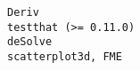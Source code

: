 \documentclass[
  letterpaper,
  DIV=11,
  numbers=noendperiod]{scrreprt}
\begin{document}
\begin{verbatim}
Deriv                                                                                                                                                                                                                                                                                                                                                                                                                                                                                                                                                                                                                                                                                                                                                                                                                                                                                                                                                                                                                                                                                                                                                                                                                                                                                    testthat (>= 0.11.0)
deSolve                                                                                                                                                                                                                                                                                                                                                                                                                                                                                                                                                                                                                                                                                                                                                                                                                                                                                                                                                                                                                                                                                                                                                                                                                                                                                    scatterplot3d, FME

\end{verbatim}
\end{document}
